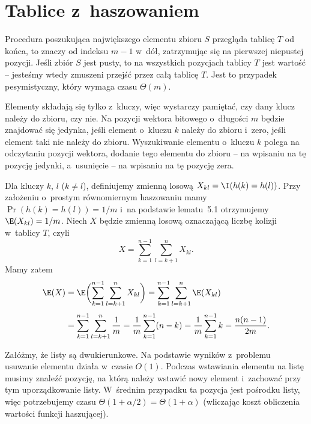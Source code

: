 \chapter{Tablice z~haszowaniem}


\exercise %
Procedura poszukująca największego elementu zbioru $S$ przegląda tablicę $T$ od końca, to znaczy od indeksu $m-1$ w~dół, zatrzymując się na pierwszej niepustej pozycji. Jeśli zbiór $S$ jest pusty, to na wszystkich pozycjach tablicy $T$ jest wartość  -- jesteśmy wtedy zmuszeni przejść przez całą tablicę $T$. Jest to przypadek pesymistyczny, który wymaga czasu $\Theta(m)$.

\exercise %
Elementy składają się tylko z~kluczy, więc wystarczy pamiętać, czy dany klucz należy do zbioru, czy nie. Na  pozycji wektora bitowego o~długości $m$ będzie znajdować się jedynka, jeśli element o~kluczu $k$ należy do zbioru i~zero, jeśli element taki nie należy do zbioru. Wyszukiwanie elementu o~kluczu $k$ polega na odczytaniu  pozycji wektora, dodanie tego elementu do zbioru -- na wpisaniu na tę pozycję jedynki, a~usunięcie -- na wpisaniu na tę pozycję zera.

\exercise %

\exercise %


\exercise %
Dla kluczy $k$, $l$ ($k\ne l$), definiujemy zmienną losową $X_{kl}=\I(h(k)=h(l))$. Przy założeniu o~prostym równomiernym haszowaniu mamy $\Pr(h(k)=h(l))=1/m$ i~na podstawie lematu~5.1 otrzymujemy $\E(X_{kl})=1/m$. Niech $X$ będzie zmienną losową oznaczającą liczbę kolizji w~tablicy $T$, czyli
\[
    X = \sum_{k=1}^{n-1}\sum_{l=k+1}^nX_{kl}.
\]
Mamy zatem
\begin{align*}
	\E(X) &= \E\biggl(\sum_{k=1}^{n-1}\sum_{l=k+1}^nX_{kl}\biggr) = \sum_{k=1}^{n-1}\sum_{l=k+1}^n\E(X_{kl}) \\[1mm]
	&= \sum_{k=1}^{n-1}\sum_{l=k+1}^n\frac{1}{m} = \frac{1}{m}\sum_{k=1}^{n-1}(n-k) = \frac{1}{m}\sum_{k=1}^{n-1}k = \frac{n(n-1)}{2m}.
\end{align*}

\exercise %
\exercise %
Załóżmy, że listy są dwukierunkowe. Na podstawie wyników z~problemu~ usuwanie elementu działa w~czasie $O(1)$. Podczas wstawiania elementu na listę musimy znaleźć pozycję, na którą należy wstawić nowy element i~zachować przy tym uporządkowanie listy. W~średnim przypadku ta pozycja jest pośrodku listy, więc potrzebujemy czasu $\Theta(1+\alpha/2)=\Theta(1+\alpha)$ (wliczając koszt obliczenia wartości funkcji haszującej).


